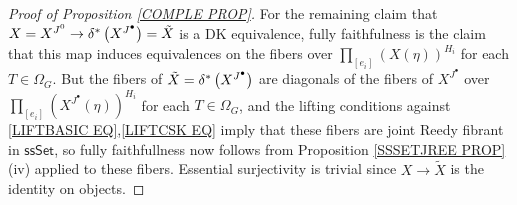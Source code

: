 \documentclass[a4paper,10pt
 ,draft
]{article}%
\begin{document}
\begin{proof}[Proof of Proposition \ref{COMPLE PROP}]
For the remaining claim that 
$X = X^{J^{0}} \to 
\delta^{\**}\left( X^{J^{\bullet}} \right)
= \tilde{X}$
is a DK equivalence,
fully faithfulness is the claim that this map induces equivalences on the fibers over
$\prod_{[e_i]} \left(X(\eta)\right)^{H_i}$
for each $T\in \Omega_G$.
But the fibers of 
$\tilde{X} = \delta^{\**}\left( X^{J^{\bullet}} \right) $
are diagonals of the fibers of 
$X^{J^{\bullet}}$ over 
$\prod_{[e_i]} \left(X^{J^{\bullet}}(\eta)\right)^{H_i}$
for each $T\in \Omega_G$,
and the lifting conditions against 
\eqref{LIFTBASIC EQ},\eqref{LIFTCSK EQ}
imply that these fibers are joint Reedy fibrant in $\mathsf{ssSet}$, 
so fully faithfullness now follows from Proposition \ref{SSSETJREE PROP}(iv) applied to these fibers.
Essential surjectivity is trivial since $X \to \tilde{X}$ is the identity on objects.
%
%
%
%
%
%
%
%
%

\end{proof}
\end{document}
